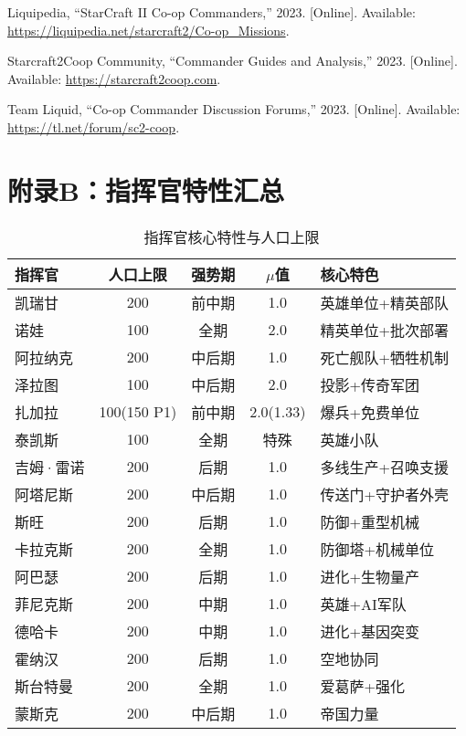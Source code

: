 \documentclass[a4paper,12pt]{article}
\begin{document}
\begin{thebibliography}{99}
 Liquipedia, ``StarCraft II Co-op Commanders,'' 2023. [Online]. Available: \url{https://liquipedia.net/starcraft2/Co-op_Missions}.

 Starcraft2Coop Community, ``Commander Guides and Analysis,'' 2023. [Online]. Available: \url{https://starcraft2coop.com}.

 Team Liquid, ``Co-op Commander Discussion Forums,'' 2023. [Online]. Available: \url{https://tl.net/forum/sc2-coop}.
\end{thebibliography}

\appendix
\section{附录B：指挥官特性汇总}

\begin{table}[h]
\centering
\caption{指挥官核心特性与人口上限}
\small
\begin{tabular}{lcccl}
\toprule
\textbf{指挥官} & \textbf{人口上限} & \textbf{强势期} & \textbf{$\mu$值} & \textbf{核心特色} \\
\midrule
凯瑞甘 & 200 & 前中期 & 1.0 & 英雄单位+精英部队 \\
诺娃 & 100 & 全期 & 2.0 & 精英单位+批次部署 \\
阿拉纳克 & 200 & 中后期 & 1.0 & 死亡舰队+牺牲机制 \\
泽拉图 & 100 & 中后期 & 2.0 & 投影+传奇军团 \\
扎加拉 & 100(150 P1) & 前中期 & 2.0(1.33) & 爆兵+免费单位 \\
泰凯斯 & 100 & 全期 & 特殊 & 英雄小队 \\
吉姆·雷诺 & 200 & 后期 & 1.0 & 多线生产+召唤支援 \\
阿塔尼斯 & 200 & 中后期 & 1.0 & 传送门+守护者外壳 \\
斯旺 & 200 & 后期 & 1.0 & 防御+重型机械 \\
卡拉克斯 & 200 & 全期 & 1.0 & 防御塔+机械单位 \\
阿巴瑟 & 200 & 后期 & 1.0 & 进化+生物量产 \\
菲尼克斯 & 200 & 中期 & 1.0 & 英雄+AI军队 \\
德哈卡 & 200 & 中期 & 1.0 & 进化+基因突变 \\
霍纳汉 & 200 & 后期 & 1.0 & 空地协同 \\
斯台特曼 & 200 & 全期 & 1.0 & 爱葛萨+强化 \\
蒙斯克 & 200 & 中后期 & 1.0 & 帝国力量 \\
\bottomrule
\end{tabular}
\end{table}
\end{document}
